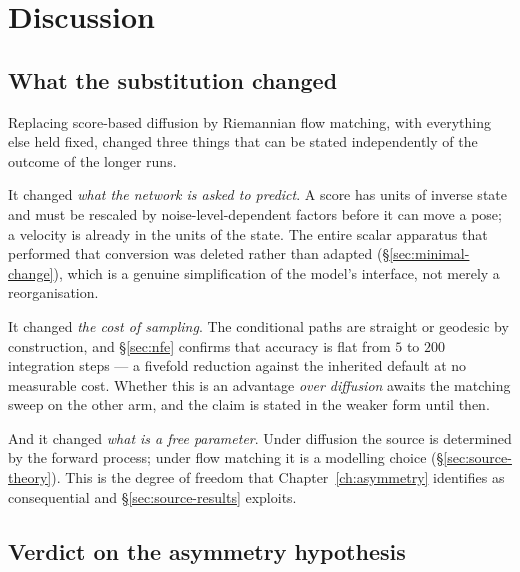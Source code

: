 \chapter{Discussion}
\label{ch:discussion}

\section{What the substitution changed}
\label{sec:what-changed}

Replacing score-based diffusion by Riemannian flow matching, with everything
else held fixed, changed three things that can be stated independently of the
outcome of the longer runs.

It changed \emph{what the network is asked to predict}. A score has units of
inverse state and must be rescaled by noise-level-dependent factors before it
can move a pose; a velocity is already in the units of the state. The entire
scalar apparatus that performed that conversion was deleted rather than
adapted (\S\ref{sec:minimal-change}), which is a genuine simplification of the
model's interface, not merely a reorganisation.

It changed \emph{the cost of sampling}. The conditional paths are straight or
geodesic by construction, and \S\ref{sec:nfe} confirms that accuracy is flat
from $5$ to $200$ integration steps --- a fivefold reduction against the
inherited default at no measurable cost. Whether this is an advantage
\emph{over diffusion} awaits the matching sweep on the other arm, and the claim
is stated in the weaker form until then.

And it changed \emph{what is a free parameter}. Under diffusion the source is
determined by the forward process; under flow matching it is a modelling
choice (\S\ref{sec:source-theory}). This is the degree of freedom that
Chapter~\ref{ch:asymmetry} identifies as consequential and
\S\ref{sec:source-results} exploits.

\section{Verdict on the asymmetry hypothesis}
\label{sec:verdict}

